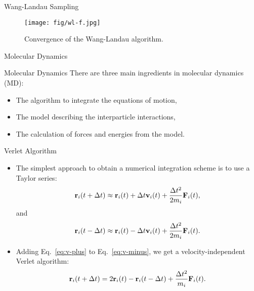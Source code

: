 \documentclass[10pt]{beamer}
\begin{document}
\begin{frame}{Wang-Landau Sampling}
\begin{figure}
  \texttt{[image: fig/wl-f.jpg]}
  \caption{Convergence of the Wang-Landau algorithm.}
\end{figure}
\end{frame}

\begin{frame}{}
  \begin{center}
    \fontsize{25pt}{6}\selectfont\vspace{1.2cm}
    \textcolor{subtitle}{Molecular Dynamics}
  \end{center}
\end{frame}

\begin{frame}{Molecular Dynamics}
There are three main ingredients in molecular dynamics (MD):
\begin{itemize}
\setlength\itemsep{1em}
  \item The algorithm to integrate the equations of motion,
  \item The model describing the interparticle interactions,
  \item The calculation of forces and energies from the model.
\end{itemize}
\end{frame}

\begin{frame}{Verlet Algorithm}
\begin{itemize}
\setlength\itemsep{1em}
  \item The simplest approach to obtain a numerical integration scheme is to use a Taylor series:
  \begin{equation}
  \label{eq:v-plus}
    {\bf r}_i(t+\Delta t) \approx {\bf r}_i(t) + \Delta t \mathbf{v}_i(t) + \frac{\Delta t^2}{2m_i}\mathbf{F}_i(t),
  \end{equation}
  and
  \begin{equation}
  \label{eq:v-minus}
    {\bf r}_i(t-\Delta t) \approx {\bf r}_i(t) - \Delta t \mathbf{v}_i(t) + \frac{\Delta t^2}{2m_i}\mathbf{F}_i(t).
  \end{equation}

  \item Adding Eq.~\ref{eq:v-plus} to Eq.~\ref{eq:v-minus}, we get a velocity-independent Verlet algorithm:
  \begin{equation}
    {\bf r}_i(t+\Delta t) = 2{\bf r}_i(t) - {\bf r}_i(t-\Delta t) + \frac{\Delta t^2}{m_i}\mathbf{F}_i(t).
  \end{equation}
\end{itemize}
\end{frame}
\end{document}
